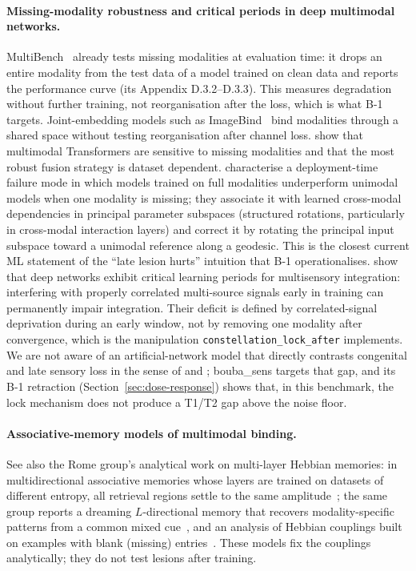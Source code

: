 \documentclass{article}
\begin{document}
\paragraph{Missing-modality robustness and critical periods in deep multimodal networks.}
MultiBench~\citep{liang2021multibench} already tests missing
modalities at evaluation time: it drops an entire modality from the
test data of a model trained on clean data and reports the
performance curve (its Appendix D.3.2--D.3.3). This measures
degradation without further training, not reorganisation after the
loss, which is what B-1 targets. Joint-embedding
models such as ImageBind~\citep{girdhar2023imagebind} bind
modalities through a shared space without testing reorganisation
after channel loss. \citet{ma2022missing} show that multimodal
Transformers are sensitive to missing modalities and that the most
robust fusion strategy is dataset dependent.
\citet{sui2026modalities} characterise a deployment-time failure
mode in which models trained on full modalities underperform
unimodal models when one modality is missing; they associate it
with learned cross-modal dependencies in principal parameter
subspaces (structured rotations, particularly in cross-modal
interaction layers) and correct it by rotating the principal input
subspace toward a unimodal reference along a geodesic. This is the
closest current ML statement of the ``late lesion hurts''
intuition that B-1 operationalises. \citet{kleinman2023critical}
show that deep networks exhibit critical learning periods for
multisensory integration: interfering with properly correlated
multi-source signals early in training can permanently impair
integration. Their deficit is defined by correlated-signal
deprivation during an early window, not by removing one modality
after convergence, which is the manipulation
\texttt{constellation\_lock\_after} implements. We are not aware of
an artificial-network model that directly contrasts congenital and
late sensory loss in the sense of \citet{cohen1999period} and
\citet{collignon2013impact}; bouba\_sens
targets that gap, and its B-1 retraction
(Section~\ref{sec:dose-response}) shows that, in this benchmark,
the lock mechanism does not produce a T1/T2 gap above the noise
floor.

\paragraph{Associative-memory models of multimodal binding.}
See also the Rome group's analytical work on multi-layer Hebbian
memories: in multidirectional associative memories whose layers
are trained on datasets of different entropy, all retrieval regions
settle to the same amplitude~\citep{alessandrelli2025cooperativeness};
the same group reports a dreaming $L$-directional memory that
recovers modality-specific patterns from a common mixed
cue~\citep{barra2026dreaming}, and an analysis of Hebbian couplings
built on examples with blank (missing) entries~\citep{agliari2025empty}.
These models fix the couplings analytically; they do not test
lesions after training.
\end{document}

